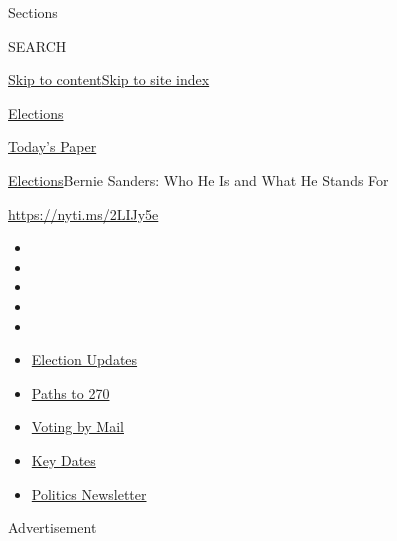 Sections

SEARCH

\protect\hyperlink{site-content}{Skip to
content}\protect\hyperlink{site-index}{Skip to site index}

\href{https://www.nytimes3xbfgragh.onion/news-event/2020-election}{Elections}

\href{https://myaccount.nytimes3xbfgragh.onion/auth/login?response_type=cookie\&client_id=vi}{}

\href{https://www.nytimes3xbfgragh.onion/section/todayspaper}{Today's
Paper}

\href{/news-event/2020-election}{Elections}\textbar{}Bernie Sanders: Who
He Is and What He Stands For

\url{https://nyti.ms/2LIJy5e}

\begin{itemize}
\item
\item
\item
\item
\item
\end{itemize}

\begin{itemize}
\item
  \href{https://www.nytimes3xbfgragh.onion/live/2020/09/07/us/trump-vs-biden?action=click\&pgtype=Article\&state=default\&region=TOP_BANNER\&context=storylines_menu}{Election
  Updates}
\item
  \href{https://www.nytimes3xbfgragh.onion/interactive/2020/us/elections/election-states-biden-trump.html?action=click\&pgtype=Article\&state=default\&region=TOP_BANNER\&context=storylines_menu}{Paths
  to 270}
\item
  \href{https://www.nytimes3xbfgragh.onion/interactive/2020/08/31/us/politics/vote-by-mail-deadlines.html?action=click\&pgtype=Article\&state=default\&region=TOP_BANNER\&context=storylines_menu}{Voting
  by Mail}
\item
  \href{https://www.nytimes3xbfgragh.onion/interactive/2019/us/elections/2020-presidential-election-calendar.html?action=click\&pgtype=Article\&state=default\&region=TOP_BANNER\&context=storylines_menu}{Key
  Dates}
\item
  \href{https://www.nytimes3xbfgragh.onion/newsletters/politics?action=click\&pgtype=Article\&state=default\&region=TOP_BANNER\&context=storylines_menu}{Politics
  Newsletter}
\end{itemize}

Advertisement

